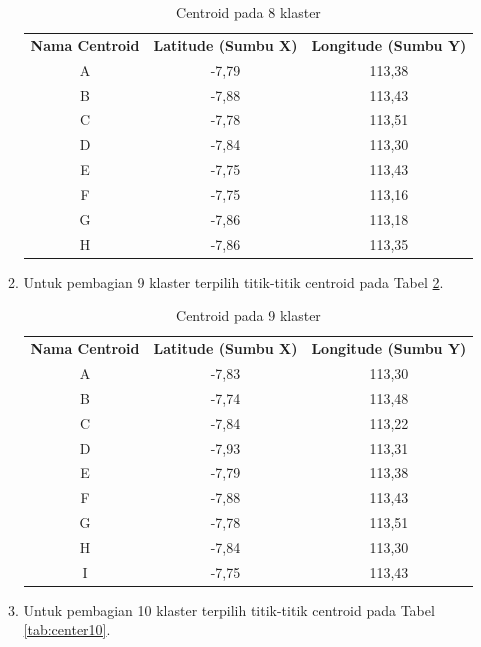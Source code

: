 \begin{enumerate}
\begin{enumerate}
\begin{table}[H]
\footnotesize
\centering
\begin{tabular}{ccc}
\rowcolor[HTML]{4472C4} 
{\color[HTML]{FFFFFF} \textbf{Nama   Centroid}} & {\color[HTML]{FFFFFF} \textbf{Latitude (Sumbu X)}} & {\color[HTML]{FFFFFF} \textbf{Longitude (Sumbu Y)}} \\
\rowcolor[HTML]{D9E1F2} 
A & -7,79 & 113,38 \\
B & -7,88 & 113,43 \\
\rowcolor[HTML]{D9E1F2} 
C & -7,78 & 113,51 \\
D & -7,84 & 113,30 \\
\rowcolor[HTML]{D9E1F2} 
E & -7,75 & 113,43 \\
F & -7,75 & 113,16 \\
\rowcolor[HTML]{D9E1F2} 
G & -7,86 & 113,18 \\
H & -7,86 & 113,35
\end{tabular}
\caption{Centroid pada 8 klaster}
\label{tab:center8}
\end{table}

	\item Untuk pembagian 9 klaster terpilih titik-titik centroid pada Tabel \ref{tab:center9}.
	
\begin{table}[H]
\footnotesize
\centering
\begin{tabular}{ccc}
\rowcolor[HTML]{4472C4} 
{\color[HTML]{FFFFFF} \textbf{Nama   Centroid}} & {\color[HTML]{FFFFFF} \textbf{Latitude (Sumbu X)}} & {\color[HTML]{FFFFFF} \textbf{Longitude (Sumbu Y)}} \\
\rowcolor[HTML]{D9E1F2} 
A & -7,83 & 113,30 \\
B & -7,74 & 113,48 \\
\rowcolor[HTML]{D9E1F2} 
C & -7,84 & 113,22 \\
D & -7,93 & 113,31 \\
\rowcolor[HTML]{D9E1F2} 
E & -7,79 & 113,38 \\
F & -7,88 & 113,43 \\
\rowcolor[HTML]{D9E1F2} 
G & -7,78 & 113,51 \\
H & -7,84 & 113,30 \\
\rowcolor[HTML]{D9E1F2} 
I & -7,75 & 113,43 \\                        
\end{tabular}
\caption{Centroid pada 9 klaster}
\label{tab:center9}
\end{table}

	\item Untuk pembagian 10 klaster terpilih titik-titik centroid pada Tabel \ref{tab:center10}.
	

\end{enumerate}
\end{enumerate}
